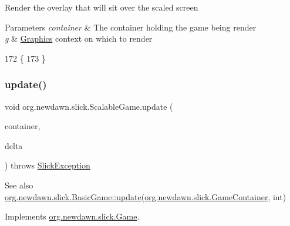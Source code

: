 Render the overlay that will sit over the scaled screen


\begin{DoxyParams}{Parameters}
{\em container} & The container holding the game being render \\
\hline
{\em g} & \mbox{\hyperlink{classorg_1_1newdawn_1_1slick_1_1_graphics}{Graphics}} context on which to render \\
\hline
\end{DoxyParams}

\begin{DoxyCode}
172                                                                       \{
173     \}
\end{DoxyCode}
\mbox{\label{classorg_1_1newdawn_1_1slick_1_1_scalable_game_a400717d797b2f4529b3904e767425524}} 
\subsubsection{\texorpdfstring{update()}{update()}}
{\footnotesize\ttfamily void org.\+newdawn.\+slick.\+Scalable\+Game.\+update (\begin{DoxyParamCaption}\item[{\mbox{\hyperlink{classorg_1_1newdawn_1_1slick_1_1_game_container}{Game\+Container}}}]{container,  }\item[{int}]{delta }\end{DoxyParamCaption}) throws \mbox{\hyperlink{classorg_1_1newdawn_1_1slick_1_1_slick_exception}{Slick\+Exception}}\hspace{0.3cm}{\ttfamily [inline]}}

\begin{DoxySeeAlso}{See also}
\mbox{\hyperlink{classorg_1_1newdawn_1_1slick_1_1_basic_game_acfe6fa05aef83bff1631af91a3e4bd20}{org.\+newdawn.\+slick.\+Basic\+Game\+::update}}(\mbox{\hyperlink{classorg_1_1newdawn_1_1slick_1_1_game_container}{org.\+newdawn.\+slick.\+Game\+Container}}, int) 
\end{DoxySeeAlso}


Implements \mbox{\hyperlink{interfaceorg_1_1newdawn_1_1slick_1_1_game_ab07b2e9463ee4631620dde0de25bdee8}{org.\+newdawn.\+slick.\+Game}}.


